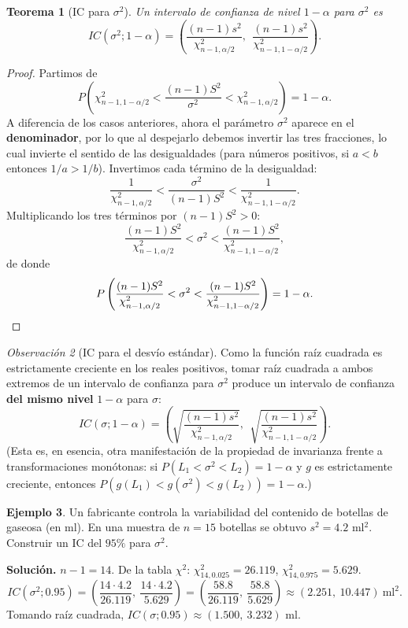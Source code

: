 \documentclass[11pt,a4paper]{article}
\theoremstyle{plain}
\newtheorem{teorema}{Teorema}[section]
\theoremstyle{definition}
\newtheorem{ejemplo}[teorema]{Ejemplo}
\theoremstyle{remark}
\newtheorem{observacion}[teorema]{Observación}
\begin{document}
\begin{teorema}[IC para $\sigma^2$]
Un intervalo de confianza de nivel $1-\alpha$ para $\sigma^2$ es
\[
IC(\sigma^2;1-\alpha) = \left(\frac{(n-1)s^2}{\chi^2_{n-1,\alpha/2}},\ \ \frac{(n-1)s^2}{\chi^2_{n-1,1-\alpha/2}}\right).
\]
\end{teorema}

\begin{proof}
Partimos de
\[
P\left(\chi^2_{n-1,1-\alpha/2} < \frac{(n-1)S^2}{\sigma^2} < \chi^2_{n-1,\alpha/2}\right) = 1-\alpha.
\]
A diferencia de los casos anteriores, ahora el parámetro $\sigma^2$ aparece en el \textbf{denominador}, por lo que al despejarlo debemos invertir las tres fracciones, lo cual invierte el sentido de las desigualdades (para números positivos, si $a<b$ entonces $1/a>1/b$). Invertimos cada término de la desigualdad:
\[
\frac{1}{\chi^2_{n-1,\alpha/2}} < \frac{\sigma^2}{(n-1)S^2} < \frac{1}{\chi^2_{n-1,1-\alpha/2}}.
\]
Multiplicando los tres términos por $(n-1)S^2>0$:
\[
\frac{(n-1)S^2}{\chi^2_{n-1,\alpha/2}} < \sigma^2 < \frac{(n-1)S^2}{\chi^2_{n-1,1-\alpha/2}},
\]
de donde
\[
P\left(\frac{(n-1)S^2}{\chi^2_{n-1,\alpha/2}} < \sigma^2 < \frac{(n-1)S^2}{\chi^2_{n-1,1-\alpha/2}}\right) = 1-\alpha. \qedhere
\]
\end{proof}

\begin{observacion}[IC para el desvío estándar]
Como la función raíz cuadrada es estrictamente creciente en los reales positivos, tomar raíz cuadrada a ambos extremos de un intervalo de confianza para $\sigma^2$ produce un intervalo de confianza \textbf{del mismo nivel} $1-\alpha$ para $\sigma$:
\[
IC(\sigma;1-\alpha) = \left(\sqrt{\frac{(n-1)s^2}{\chi^2_{n-1,\alpha/2}}},\ \ \sqrt{\frac{(n-1)s^2}{\chi^2_{n-1,1-\alpha/2}}}\right).
\]
(Esta es, en esencia, otra manifestación de la propiedad de invarianza frente a transformaciones monótonas: si $P(L_1<\sigma^2<L_2)=1-\alpha$ y $g$ es estrictamente creciente, entonces $P(g(L_1)<g(\sigma^2)<g(L_2))=1-\alpha$.)
\end{observacion}

\begin{ejemplo}
Un fabricante controla la variabilidad del contenido de botellas de gaseosa (en ml). En una muestra de $n=15$ botellas se obtuvo $s^2=4.2$ ml$^2$. Construir un IC del $95\%$ para $\sigma^2$.

\textbf{Solución.} $n-1=14$. De la tabla $\chi^2$: $\chi^2_{14,0.025}=26.119$, $\chi^2_{14,0.975}=5.629$.
\[
IC(\sigma^2;0.95) = \left(\frac{14\cdot 4.2}{26.119},\ \frac{14\cdot 4.2}{5.629}\right) = \left(\frac{58.8}{26.119},\ \frac{58.8}{5.629}\right) \approx (2.251,\ 10.447)\ \text{ml}^2.
\]
Tomando raíz cuadrada, $IC(\sigma;0.95)\approx(1.500,\ 3.232)$ ml.
\end{ejemplo}
\end{document}
